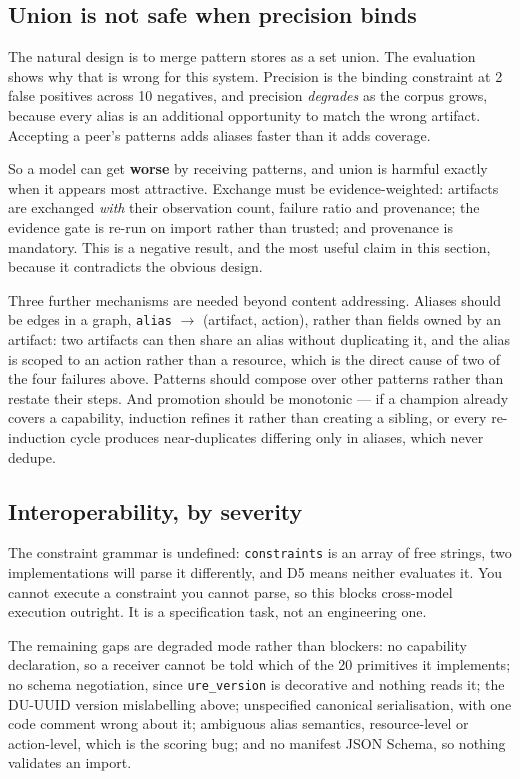 \documentclass[11pt,twocolumn]{article}
\begin{document}
\subsection{Union is not safe when precision binds}

The natural design is to merge pattern stores as a set union. The evaluation
shows why that is wrong for this system. Precision is the binding constraint at
2 false positives across 10 negatives, and precision \emph{degrades} as the
corpus grows, because every alias is an additional opportunity to match the
wrong artifact. Accepting a peer's patterns adds aliases faster than it adds
coverage.

So a model can get \textbf{worse} by receiving patterns, and union is harmful
exactly when it appears most attractive. Exchange must be evidence-weighted:
artifacts are exchanged \emph{with} their observation count, failure ratio and
provenance; the evidence gate is re-run on import rather than trusted; and
provenance is mandatory. This is a negative result, and the most useful claim in
this section, because it contradicts the obvious design.

Three further mechanisms are needed beyond content addressing. Aliases should
be edges in a graph, \texttt{alias} $\rightarrow$ (artifact, action), rather than
fields owned by an artifact: two artifacts can then share an alias without
duplicating it, and the alias is scoped to an action rather than a resource,
which is the direct cause of two of the four failures above. Patterns should
compose over other patterns rather than restate their steps. And promotion
should be monotonic --- if a champion already covers a capability, induction
refines it rather than creating a sibling, or every re-induction cycle produces
near-duplicates differing only in aliases, which never dedupe.

\subsection{Interoperability, by severity}

The constraint grammar is undefined: \texttt{constraints} is an array of free
strings, two implementations will parse it differently, and D5 means neither
evaluates it. You cannot execute a constraint you cannot parse, so this blocks
cross-model execution outright. It is a specification task, not an engineering
one.

The remaining gaps are degraded mode rather than blockers: no capability
declaration, so a receiver cannot be told which of the 20 primitives it
implements; no schema negotiation, since \texttt{ure\_version} is decorative and
nothing reads it; the DU-UUID version mislabelling above; unspecified canonical
serialisation, with one code comment wrong about it; ambiguous alias semantics,
resource-level or action-level, which is the scoring bug; and no manifest JSON
Schema, so nothing validates an import.
\end{document}
